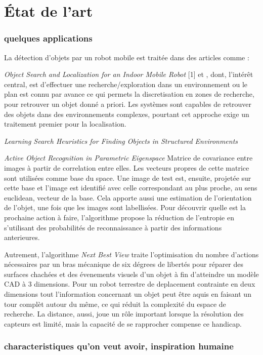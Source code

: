 
\chapter{État de l'art}
  
\subsection { quelques applications}
 La détection d'objets par un robot mobile est traitée dans des articles comme : 

\textit{Object Search and Localization for an Indoor Mobile Robot} [1] et , dont, l'intérêt central, est d'effectuer une recherche/exploration dans un environnement ou le plan est connu par avance ce qui permets la discretisation en zones de recherche, pour retrouver un objet donné a priori. Les systèmes sont capables de retrouver des objets dans des environnements complexes, pourtant cet approche exige un traitement premier pour la localisation.

\textit{Learning Search Heuristics for Finding Objects in Structured Environments} 


\textit{Active Object Recognition in Parametric Eigenspace}
Matrice de covariance entre images à partir de correlation entre elles. Les vecteurs propres de cette matrice sont utilisées comme base du space. Une image de test est, ensuite, projetée sur cette base et l'image est identifié avec celle correspondant au plus proche, au sens euclidean, vecteur de la base. Cela apporte aussi une estimation de l'orientation de l'objet, une fois que les images sont labellisées. Pour découvrir quelle est la prochaine action à faire, l'algorithme propose la réduction de l'entropie en s'utilisant des probabilités de reconnaissance à partir des informations anterieures.
 
Autrement, l'algorithme \textit{Next Best View} traite l'optimisation du nombre d'actions nécessaires par un bras mécanique de six dégrees de libertés pour réparer des surfaces chachées et des évenements visuels d'un objet à fin d'atteindre un modèle CAD à 3 dimensions. Pour un robot terrestre de deplacement contrainte en deux dimensions tout l'information concernant un objet peut être aquis en faisant un tour complèt autour du même, ce qui réduit la complexité du espace de recherche. La distance, aussi, joue un rôle important lorsque la résolution des capteurs est limité, mais la capacité de se rapprocher compense ce handicap.



\subsection{characteristiques qu'on veut avoir, inspiration humaine}

